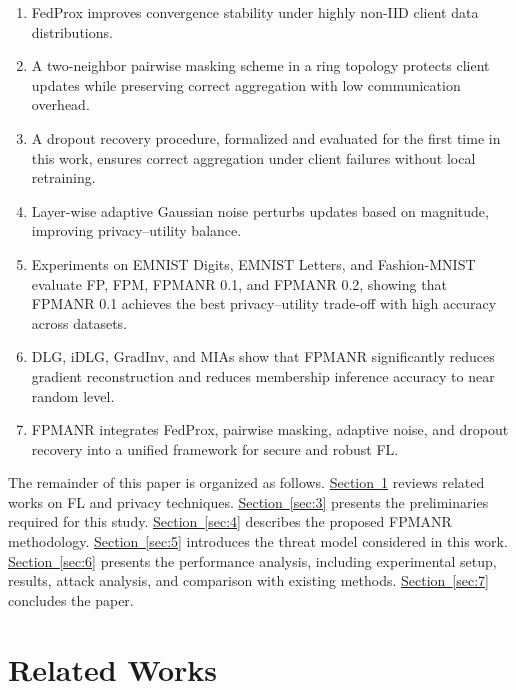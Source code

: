 \documentclass[a4paper,fleqn]{cas-dc}
\newcommand{\xsec}[1]{\hyperref[#1]{Section~\ref*{#1}}}
\begin{document}
\begin{enumerate}
\item
  FedProx improves convergence stability under highly non-IID client data distributions.
\item
  A two-neighbor pairwise masking scheme in a ring topology protects client updates while preserving correct aggregation with low communication overhead.
\item
  A dropout recovery procedure, formalized and evaluated for the first time in this work, ensures correct aggregation under client failures without local retraining.
\item
  Layer-wise adaptive Gaussian noise perturbs updates based on magnitude, improving privacy--utility balance.
\item
  Experiments on EMNIST Digits, EMNIST Letters, and Fashion-MNIST evaluate FP, FPM, FPMANR 0.1, and FPMANR 0.2, showing that FPMANR 0.1 achieves the best privacy--utility trade-off with high accuracy across datasets.
\item
  DLG, iDLG, GradInv, and MIAs show that FPMANR significantly reduces gradient reconstruction and reduces membership inference accuracy to near random level.
\item
  FPMANR integrates FedProx, pairwise masking, adaptive noise, and dropout recovery into a unified framework for secure and robust FL.
\end{enumerate}

The remainder of this paper is organized as follows. \xsec{sec:2} reviews related works on FL and privacy techniques. \xsec{sec:3} presents the preliminaries required for this study. \xsec{sec:4} describes the proposed FPMANR methodology. \xsec{sec:5} introduces the threat model considered in this work. \xsec{sec:6} presents the performance analysis, including experimental setup, results, attack analysis, and comparison with existing methods. \xsec{sec:7} concludes the paper.

\section{Related Works}
\label{sec:2}
\end{document}
